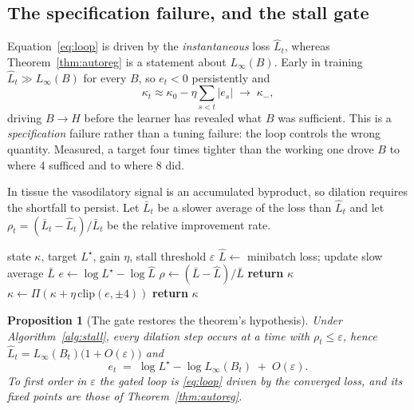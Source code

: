 \documentclass[11pt]{report}
\theoremstyle{plain}
\newtheorem{proposition}{Proposition}[chapter]
\theoremstyle{definition}
\theoremstyle{remark}
\begin{document}
\subsection{The specification failure, and the stall gate}

Equation~\eqref{eq:loop} is driven by the \emph{instantaneous} loss $\widehat L_t$,
whereas Theorem~\ref{thm:autoreg} is a statement about $L_\infty(B)$. Early in training
$\widehat L_t \gg L_\infty(B)$ for every $B$, so $e_t < 0$ persistently and
\begin{equation}
  \kappa_t \approx \kappa_0 - \eta\textstyle\sum_{s<t}|e_s| \;\longrightarrow\; \kappa_-,
\end{equation}
driving $B \to H$ before the learner has revealed what $B$ was sufficient. This is a
\emph{specification} failure rather than a tuning failure: the loop controls the wrong
quantity. Measured, a target four times tighter than the working one drove $B$ to
\numOverPerfuseFour{} where $4$ sufficed and to \numOverPerfuseEight{} where $8$ did.

In tissue the vasodilatory signal is an accumulated byproduct, so dilation requires the
shortfall to persist. Let $\bar L_t$ be a slower average of the loss than $\widehat L_t$
and let $\rho_t = (\bar L_t - \widehat L_t)/\bar L_t$ be the relative improvement rate.

\begin{algorithm}[t]
\caption{Stall-gated autoregulation (one training step)}
\label{alg:stall}
\begin{algorithmic}[1]
\Require state $\kappa$, target $L^\star$, gain $\eta$, stall threshold $\varepsilon$
\State $\widehat L \gets$ minibatch loss; \; update slow average $\bar L$
\State $e \gets \log L^\star - \log \widehat L$
\State $\rho \gets (\bar L - \widehat L)/\bar L$ 
  \State \textbf{return} $\kappa$ 
\EndIf
\State $\kappa \gets \Pi(\kappa + \eta\,\mathrm{clip}(e,\pm 4))$
\State \textbf{return} $\kappa$
\end{algorithmic}
\end{algorithm}

\begin{proposition}[The gate restores the theorem's hypothesis]
\label{prop:stall}
Under Algorithm~\ref{alg:stall}, every dilation step occurs at a time with
$\rho_t \le \varepsilon$, hence
$\widehat L_t = L_\infty(B_t)\bigl(1 + O(\varepsilon)\bigr)$ and
\begin{equation}
  e_t \;=\; \log L^\star - \log L_\infty(B_t) \;+\; O(\varepsilon).
\end{equation}
To first order in $\varepsilon$ the gated loop is \eqref{eq:loop} driven by the converged
loss, and its fixed points are those of Theorem~\ref{thm:autoreg}.
\end{proposition}
\end{document}
